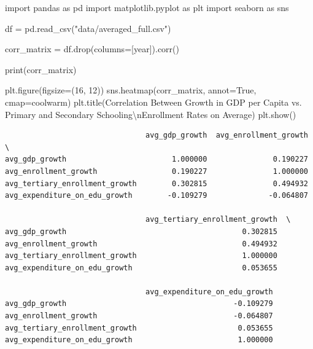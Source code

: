 \documentclass[
  letterpaper,
  DIV=11,
  numbers=noendperiod]{scrartcl}
\newenvironment{Shaded}{\begin{snugshade}}{\end{snugshade}}
\newcommand{\BuiltInTok}[1]{\textcolor[rgb]{0.00,0.23,0.31}{#1}}
\newcommand{\CharTok}[1]{\textcolor[rgb]{0.13,0.47,0.30}{#1}}
\newcommand{\DecValTok}[1]{\textcolor[rgb]{0.68,0.00,0.00}{#1}}
\newcommand{\ImportTok}[1]{\textcolor[rgb]{0.00,0.46,0.62}{#1}}
\newcommand{\NormalTok}[1]{\textcolor[rgb]{0.00,0.23,0.31}{#1}}
\newcommand{\OperatorTok}[1]{\textcolor[rgb]{0.37,0.37,0.37}{#1}}
\newcommand{\StringTok}[1]{\textcolor[rgb]{0.13,0.47,0.30}{#1}}
\newcommand{\VariableTok}[1]{\textcolor[rgb]{0.07,0.07,0.07}{#1}}
\begin{document}
\begin{Shaded}
\begin{Highlighting}[]
\ImportTok{import}\NormalTok{ pandas }\ImportTok{as}\NormalTok{ pd}
\ImportTok{import}\NormalTok{ matplotlib.pyplot }\ImportTok{as}\NormalTok{ plt}
\ImportTok{import}\NormalTok{ seaborn }\ImportTok{as}\NormalTok{ sns}

\NormalTok{df }\OperatorTok{=}\NormalTok{ pd.read\_csv(}\StringTok{"data/averaged\_full.csv"}\NormalTok{)}

\NormalTok{corr\_matrix }\OperatorTok{=}\NormalTok{ df.drop(columns}\OperatorTok{=}\NormalTok{[}\StringTok{\textquotesingle{}year\textquotesingle{}}\NormalTok{]).corr()}

\BuiltInTok{print}\NormalTok{(corr\_matrix)}

\NormalTok{plt.figure(figsize}\OperatorTok{=}\NormalTok{(}\DecValTok{16}\NormalTok{, }\DecValTok{12}\NormalTok{))}
\NormalTok{sns.heatmap(corr\_matrix, annot}\OperatorTok{=}\VariableTok{True}\NormalTok{, cmap}\OperatorTok{=}\StringTok{\textquotesingle{}coolwarm\textquotesingle{}}\NormalTok{)}
\NormalTok{plt.title(}\StringTok{\textquotesingle{}Correlation Between Growth in GDP per Capita vs. Primary and Secondary Schooling}\CharTok{\textbackslash{}n}\StringTok{Enrollment Rates on Average\textquotesingle{}}\NormalTok{)}
\NormalTok{plt.show()}
\end{Highlighting}
\end{Shaded}

\begin{verbatim}
                                avg_gdp_growth  avg_enrollment_growth  \
avg_gdp_growth                        1.000000               0.190227   
avg_enrollment_growth                 0.190227               1.000000   
avg_tertiary_enrollment_growth        0.302815               0.494932   
avg_expenditure_on_edu_growth        -0.109279              -0.064807   

                                avg_tertiary_enrollment_growth  \
avg_gdp_growth                                        0.302815   
avg_enrollment_growth                                 0.494932   
avg_tertiary_enrollment_growth                        1.000000   
avg_expenditure_on_edu_growth                         0.053655   

                                avg_expenditure_on_edu_growth  
avg_gdp_growth                                      -0.109279  
avg_enrollment_growth                               -0.064807  
avg_tertiary_enrollment_growth                       0.053655  
avg_expenditure_on_edu_growth                        1.000000  
\end{verbatim}
\end{document}
